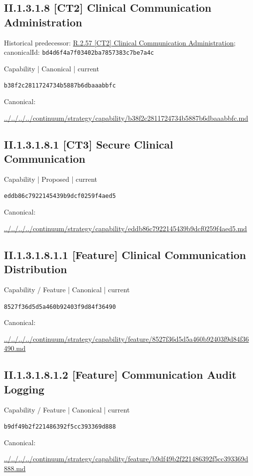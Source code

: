 \documentclass[10pt,a4paper]{article}
\begin{document}
\subsection*{II.1.3.1.8 [CT2] Clinical Communication Administration}
Historical predecessor: \hyperref[element-bd4d6f4a7f03402ba7857383c7be7a4c]{R.2.57 [CT2] Clinical Communication Administration}; canonicalId: \texttt{bd4d6f4a7f03402ba7857383c7be7a4c}\par
\label{element-b38f2c2811724734b5887b6dbaaabbfc}
{\small Capability | Canonical | current}\par
\texttt{b38f2c2811724734b5887b6dbaaabbfc}\par
Canonical: \par
{\footnotesize\url{../../../../continuum/strategy/capability/b38f2c2811724734b5887b6dbaaabbfc.md}}\par
\subsection*{II.1.3.1.8.1 [CT3] Secure Clinical Communication}
\label{element-eddb86c7922145439b9dcf0259f4aed5}
{\small Capability | Proposed | current}\par
\texttt{eddb86c7922145439b9dcf0259f4aed5}\par
Canonical: \par
{\footnotesize\url{../../../../continuum/strategy/capability/eddb86c7922145439b9dcf0259f4aed5.md}}\par
\subsection*{II.1.3.1.8.1.1 [Feature] Clinical Communication Distribution}
\label{element-8527f36d5d5a460b92403f9d84f36490}
{\small Capability / Feature | Canonical | current}\par
\texttt{8527f36d5d5a460b92403f9d84f36490}\par
Canonical: \par
{\footnotesize\url{../../../../continuum/strategy/capability/feature/8527f36d5d5a460b92403f9d84f36490.md}}\par
\subsection*{II.1.3.1.8.1.2 [Feature] Communication Audit Logging}
\label{element-b9df49b2f221486392f5cc393369d888}
{\small Capability / Feature | Canonical | current}\par
\texttt{b9df49b2f221486392f5cc393369d888}\par
Canonical: \par
{\footnotesize\url{../../../../continuum/strategy/capability/feature/b9df49b2f221486392f5cc393369d888.md}}\par
\end{document}
